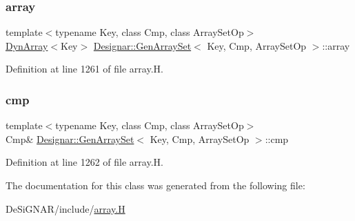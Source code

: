 \subsubsection{\texorpdfstring{array}{array}}
{\footnotesize\ttfamily template$<$typename Key, class Cmp, class Array\+Set\+Op$>$ \\
\hyperlink{class_designar_1_1_dyn_array}{Dyn\+Array}$<$Key$>$ \hyperlink{class_designar_1_1_gen_array_set}{Designar\+::\+Gen\+Array\+Set}$<$ Key, Cmp, Array\+Set\+Op $>$\+::array}



Definition at line 1261 of file array.\+H.

\mbox{\label{class_designar_1_1_gen_array_set_a2b1e3c653865a794eab7d19e43c1b0de}} 
\subsubsection{\texorpdfstring{cmp}{cmp}}
{\footnotesize\ttfamily template$<$typename Key, class Cmp, class Array\+Set\+Op$>$ \\
Cmp\& \hyperlink{class_designar_1_1_gen_array_set}{Designar\+::\+Gen\+Array\+Set}$<$ Key, Cmp, Array\+Set\+Op $>$\+::cmp}



Definition at line 1262 of file array.\+H.



The documentation for this class was generated from the following file\+:\begin{DoxyCompactItemize}
\item 
De\+Si\+G\+N\+A\+R/include/\hyperlink{array_8_h}{array.\+H}\end{DoxyCompactItemize}
